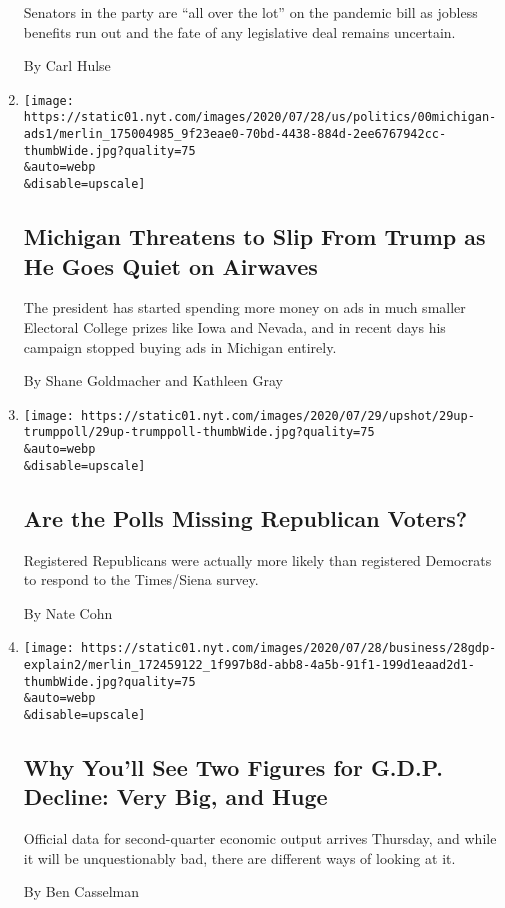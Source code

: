 \begin{enumerate}
  Senators in the party are ``all over the lot'' on the pandemic bill as
  jobless benefits run out and the fate of any legislative deal remains
  uncertain.

  By Carl Hulse
\item
  \href{/2020/07/29/us/politics/michigan-trump-biden-2020.html}{}

  \texttt{[image: https://static01.nyt.com/images/2020/07/28/us/politics/00michigan-ads1/merlin\_175004985\_9f23eae0-70bd-4438-884d-2ee6767942cc-thumbWide.jpg?quality=75\\\&auto=webp\\\&disable=upscale]}

  \hypertarget{michigan-threatens-to-slip-from-trump-as-he-goes-quiet-on-airwaves-1}{%
  \subsection{Michigan Threatens to Slip From Trump as He Goes Quiet on
  Airwaves}\label{michigan-threatens-to-slip-from-trump-as-he-goes-quiet-on-airwaves-1}}

  The president has started spending more money on ads in much smaller
  Electoral College prizes like Iowa and Nevada, and in recent days his
  campaign stopped buying ads in Michigan entirely.

  By Shane Goldmacher and Kathleen Gray
\item
  \href{/2020/07/29/upshot/polls-political-party-republicans.html}{}

  \texttt{[image: https://static01.nyt.com/images/2020/07/29/upshot/29up-trumppoll/29up-trumppoll-thumbWide.jpg?quality=75\\\&auto=webp\\\&disable=upscale]}

  \hypertarget{are-the-polls-missing-republican-voters}{%
  \subsection{Are the Polls Missing Republican
  Voters?}\label{are-the-polls-missing-republican-voters}}

  Registered Republicans were actually more likely than registered
  Democrats to respond to the Times/Siena survey.

  By Nate Cohn
\item
  \href{/2020/07/29/business/economy/us-gdp-report.html}{}

  \texttt{[image: https://static01.nyt.com/images/2020/07/28/business/28gdp-explain2/merlin\_172459122\_1f997b8d-abb8-4a5b-91f1-199d1eaad2d1-thumbWide.jpg?quality=75\\\&auto=webp\\\&disable=upscale]}

  \hypertarget{why-youll-see-two-figures-for-gdp-decline-very-big-and-huge}{%
  \subsection{Why You'll See Two Figures for G.D.P. Decline: Very Big,
  and
  Huge}\label{why-youll-see-two-figures-for-gdp-decline-very-big-and-huge}}

  Official data for second-quarter economic output arrives Thursday, and
  while it will be unquestionably bad, there are different ways of
  looking at it.

  By Ben Casselman
\end{enumerate}

